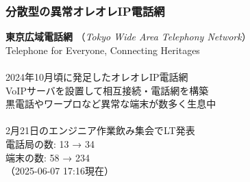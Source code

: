 \documentclass[
  lualatex,
  aspectratio=169,
  14pt
]{beamer}
\begin{document}
\begin{frame}
  \frametitle{分散型の異常オレオレIP電話網}

  \textbf{東京広域電話網}
  （\textit{Tokyo Wide Area Telephony Network}）\\
  \hspace{1.5\zw}Telephone for Everyone, Connecting Heritages
  \\~\\[-.5\baselineskip]

  2024年10月頃に発足したオレオレIP電話網\\
  \hspace{1.5\zw}VoIPサーバを設置して相互接続・電話網を構築\\
  \hspace{1.5\zw}黒電話やワープロなど異常な端末が数多く生息中
  \\~\\[-.5\baselineskip]

  2月21日のエンジニア作業飲み集会でLT発表\\
  \hspace{1.5\zw}電話局の数: 13 → 34\\
  \hspace{2.5\zw}端末の数: 58 → 234\\
  \hspace{1.5\zw}（2025-06-07 17:16現在）

\end{frame}
\end{document}
